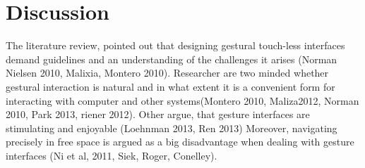 \chapter{Discussion}
\label{chap:discussion}







The literature review, pointed out that designing gestural touch-less interfaces demand guidelines and an understanding of the challenges it arises (Norman Nielsen 2010, Malixia, Montero 2010). Researcher are two minded whether gestural interaction is natural and in what extent it is a convenient form for interacting with computer and other systems(Montero 2010, Maliza2012, Norman 2010, Park 2013, riener 2012). Other argue, that gesture interfaces are stimulating and enjoyable (Loehnman 2013, Ren 2013) Moreover, navigating precisely in free space is argued as a big disadvantage when dealing with gesture interfaces (Ni et al, 2011, Siek, Roger, Conelley).

